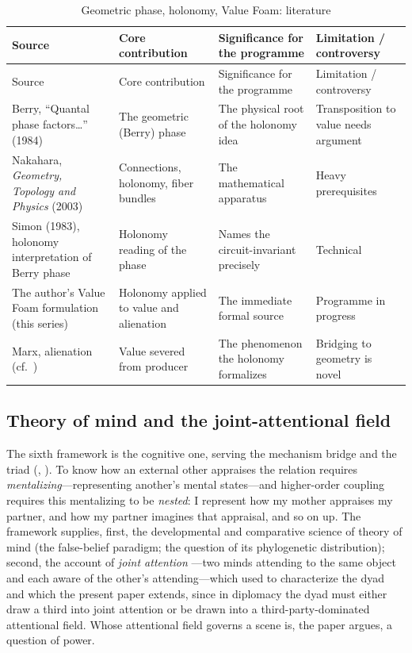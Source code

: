 \goldrule
\footnotesize
\begin{longtable}{Y Y Y Y}
\caption{Geometric phase, holonomy, Value Foam: literature}\label{p07:tab:lit-holonomy}\\
\toprule
{}
Source & Core contribution & Significance for the programme & Limitation / controversy \\
\midrule
\endfirsthead
{}
Source & Core contribution & Significance for the programme & Limitation / controversy \\
\midrule
\endhead
Berry, ``Quantal phase factors\ldots'' (1984) & The geometric (Berry) phase & The physical root of the holonomy idea & Transposition to value needs argument \\
Nakahara, \emph{Geometry, Topology and Physics} (2003) & Connections, holonomy, fiber bundles & The mathematical apparatus & Heavy prerequisites \\
Simon (1983), holonomy interpretation of Berry phase & Holonomy reading of the phase & Names the circuit-invariant precisely & Technical \\
The author's Value Foam formulation (this series) & Holonomy applied to value and alienation & The immediate formal source & Programme in progress \\
Marx, alienation (cf.\ ) & Value severed from producer & The phenomenon the holonomy formalizes & Bridging to geometry is novel \\
\bottomrule
\end{longtable}

\subsection{Theory of mind and the joint-attentional field}
The sixth framework is the cognitive one, serving the mechanism bridge and the triad (, ). To know how an external other appraises the relation requires \emph{mentalizing}---representing another's mental states---and higher-order coupling requires this mentalizing to be \emph{nested}: I represent how my mother appraises my partner, and how my partner imagines that appraisal, and so on up. The framework supplies, first, the developmental and comparative science of theory of mind \parencite{premack1978,wimmer1983} (the false-belief paradigm; the question of its phylogenetic distribution); second, the account of \emph{joint attention} \parencite{tomasello2008}---two minds attending to the same object and each aware of the other's attending---which  used to characterize the dyad and which the present paper extends, since in diplomacy the dyad must either draw a third into joint attention or be drawn into a third-party-dominated attentional field. Whose attentional field governs a scene is, the paper argues, a question of power.

